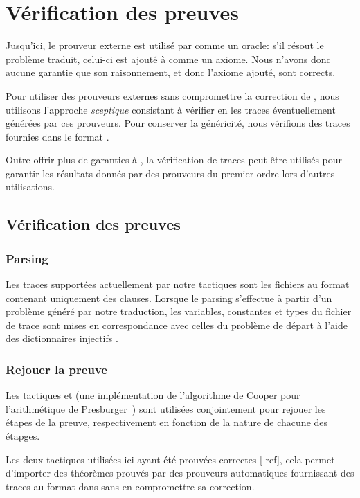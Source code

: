 \section{Vérification des preuves \tff}
\label{sec:traces}

Jusqu'ici, le prouveur externe est utilisé par \holfour comme un
oracle: s'il résout le problème traduit, celui-ci est ajouté à \holfour
comme un axiome. Nous n'avons donc aucune garantie que son raisonnement,
et donc l'axiome ajouté, sont corrects.

Pour utiliser des prouveurs externes sans compromettre la correction de
\holfour, nous utilisons l'approche \emph{sceptique} consistant à
vérifier en \holfour les traces éventuellement générées par ces
prouveurs. Pour conserver la généricité, nous vérifions des traces
fournies dans le format \tff.

Outre offrir plus de garanties à \holfour, la vérification de traces
\tff peut être utilisés pour garantir les résultats donnés par des
prouveurs du premier ordre lors d'autres utilisations.


\subsection{Vérification des preuves}
\subsubsection{Parsing}
Les traces supportées actuellement par notre tactiques sont les fichiers
au format \tff contenant uniquement des clauses. Lorsque le parsing
s'effectue à partir d'un problème généré par notre traduction, les
variables, constantes et types du fichier de trace sont mises en
correspondance avec celles du problème de départ à l'aide des
dictionnaires injectifs \holfour.


\subsubsection{Rejouer la preuve}

Les tactiques \metistac et \coopertac (une implémentation de
l'algorithme de Cooper pour l'arithmétique de
Presburger~\cite{Norrish03completeinteger}) sont utilisées conjointement
pour rejouer les étapes de la preuve, respectivement en fonction de la
nature de chacune des étapges.

Les deux tactiques utilisées ici ayant été prouvées correctes [\todo
ref], cela permet d'importer des théorèmes prouvés par des prouveurs
automatiques fournissant des traces au format \tff dans \holfour sans en
compromettre sa correction.

